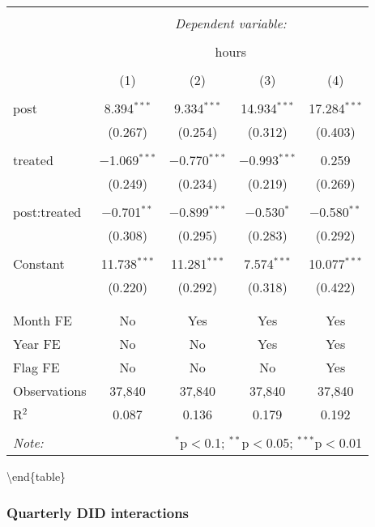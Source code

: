 \documentclass[11pt,]{article}
\begin{document}
\begin{tabular}{@{\extracolsep{5pt}}lcccc} 
\\[-1.8ex]\hline 
\hline \\[-1.8ex] 
 & \multicolumn{4}{c}{\textit{Dependent variable:}} \\ 
\cline{2-5} 
\\[-1.8ex] & \multicolumn{4}{c}{hours} \\ 
\\[-1.8ex] & (1) & (2) & (3) & (4)\\ 
\hline \\[-1.8ex] 
 post & 8.394$^{***}$ & 9.334$^{***}$ & 14.934$^{***}$ & 17.284$^{***}$ \\ 
  & (0.267) & (0.254) & (0.312) & (0.403) \\ 
  & & & & \\ 
 treated & $-$1.069$^{***}$ & $-$0.770$^{***}$ & $-$0.993$^{***}$ & 0.259 \\ 
  & (0.249) & (0.234) & (0.219) & (0.269) \\ 
  & & & & \\ 
 post:treated & $-$0.701$^{**}$ & $-$0.899$^{***}$ & $-$0.530$^{*}$ & $-$0.580$^{**}$ \\ 
  & (0.308) & (0.295) & (0.283) & (0.292) \\ 
  & & & & \\ 
 Constant & 11.738$^{***}$ & 11.281$^{***}$ & 7.574$^{***}$ & 10.077$^{***}$ \\ 
  & (0.220) & (0.292) & (0.318) & (0.422) \\ 
  & & & & \\ 
\hline \\[-1.8ex] 
Month FE & No & Yes & Yes & Yes \\ 
Year FE & No & No & Yes & Yes \\ 
Flag FE & No & No & No & Yes \\ 
Observations & 37,840 & 37,840 & 37,840 & 37,840 \\ 
R$^{2}$ & 0.087 & 0.136 & 0.179 & 0.192 \\ 
\hline 
\hline \\[-1.8ex] 
\textit{Note:}  & \multicolumn{4}{r}{$^{*}$p$<$0.1; $^{**}$p$<$0.05; $^{***}$p$<$0.01} \\ 
\end{tabular}

\textbackslash{}end\{table\}

\hypertarget{quarterly-did-interactions}{%
\subsubsection{Quarterly DID
interactions}\label{quarterly-did-interactions}}
\end{document}
